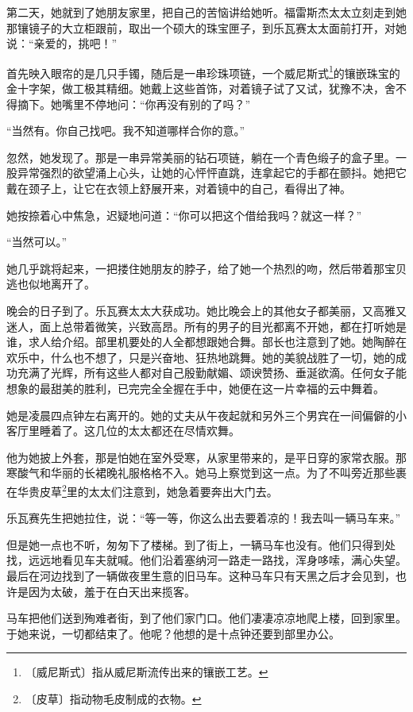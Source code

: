\documentclass[12pt,UTF-8,openany]{ctexbook}
\begin{document}
\begin{normalsize}
    第二天，她就到了她朋友家里，把自己的苦恼讲给她听。福雷斯杰太太立刻走到她那镶镜子的大立柜跟前，取出一个硕大的珠宝匣子，到乐瓦赛太太面前打开，对她说：“亲爱的，挑吧！”
    
    首先映入眼帘的是几只手镯，随后是一串珍珠项链，一个威尼斯式\footnote{〔威尼斯式〕指从威尼斯流传出来的镶嵌工艺。}的镶嵌珠宝的金十字架，做工极其精细。她戴上这些首饰，对着镜子试了又试，犹豫不决，舍不得摘下。她嘴里不停地问：“你再没有别的了吗？”
    
    “当然有。你自己找吧。我不知道哪样合你的意。”
    
    忽然，她发现了。那是一串异常美丽的钻石项链，躺在一个青色缎子的盒子里。一股异常强烈的欲望涌上心头，让她的心怦怦直跳，连拿起它的手都在颤抖。她把它戴在颈子上，让它在衣领上舒展开来，对着镜中的自己，看得出了神。
    
    她按捺着心中焦急，迟疑地问道：“你可以把这个借给我吗？就这一样？”
    
    “当然可以。”
    
    她几乎跳将起来，一把搂住她朋友的脖子，给了她一个热烈的吻，然后带着那宝贝逃也似地离开了。
    
    晚会的日子到了。乐瓦赛太太大获成功。她比晚会上的其他女子都美丽，又高雅又迷人，面上总带着微笑，兴致高昂。所有的男子的目光都离不开她，都在打听她是谁，求人给介绍。部里机要处的人全都想跟她合舞。部长也注意到了她。她陶醉在欢乐中，什么也不想了，只是兴奋地、狂热地跳舞。她的美貌战胜了一切，她的成功充满了光辉，所有这些人都对自己殷勤献媚、颂谀赞扬、垂涎欲滴。任何女子能想象的最甜美的胜利，已完完全全握在手中，她便在这一片幸福的云中舞着。
    
    她是凌晨四点钟左右离开的。她的丈夫从午夜起就和另外三个男宾在一间偏僻的小客厅里睡着了。这几位的太太都还在尽情欢舞。
    
    他为她披上外套，那是怕她在室外受寒，从家里带来的，是平日穿的家常衣服。那寒酸气和华丽的长裙晚礼服格格不入。她马上察觉到这一点。为了不叫旁近那些裹在华贵皮草\footnote{〔皮草〕指动物毛皮制成的衣物。}里的太太们注意到，她急着要奔出大门去。
    
    乐瓦赛先生把她拉住，说：“等一等，你这么出去要着凉的！我去叫一辆马车来。”
    
    但是她一点也不听，匆匆下了楼梯。到了街上，一辆马车也没有。他们只得到处找，远远地看见车夫就喊。他们沿着塞纳河一路走一路找，浑身哆嗦，满心失望。最后在河边找到了一辆做夜里生意的旧马车。这种马车只有天黑之后才会见到，也许是因为太破，羞于在白天出来揽客。
    
    马车把他们送到殉难者街，到了他们家门口。他们凄凄凉凉地爬上楼，回到家里。于她来说，一切都结束了。他呢？他想的是十点钟还要到部里办公。
    

\end{normalsize}
\end{document}
